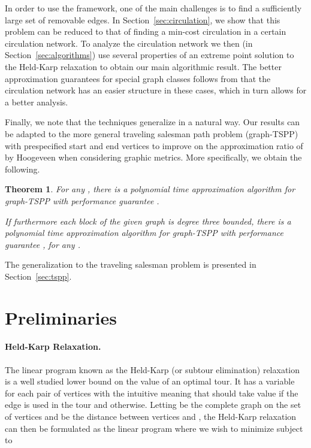 \documentclass[letterpaper,11pt]{article}
\newtheorem{theorem}{Theorem}[section]
\newcommand{\HPP}{graph-TSPP\xspace}
\begin{document}
    In order to use the framework, one of the main challenges is to find a
    sufficiently large set of removable edges. In
    Section~\ref{sec:circulation}, we show that this problem can be
    reduced to that of finding a min-cost circulation in a certain
    circulation network.  To analyze the circulation network we then (in
    Section~\ref{sec:algorithms}) use several properties of an extreme point solution to
    the Held-Karp relaxation to obtain our main algorithmic result. The
    better approximation guarantees for special graph classes follows from
    that the circulation network has an easier structure in these cases,
    which in turn allows for a better analysis.

    Finally, we note that the techniques generalize in a natural way. Our
    results can be adapted to the more general traveling salesman path
    problem (\HPP) with prespecified start and end vertices to improve on the
    approximation ratio of  by Hoogeveen \cite{Hoo91} when
    considering graphic metrics. More specifically, we obtain the
    following.
    \begin{theorem}\label{thm:approximationratiohpp}
        For any , there is a polynomial time approximation algorithm for
        \HPP with performance guarantee 
        .

        If furthermore each block of the given graph is degree three bounded, there is a
        polynomial time approximation algorithm for \HPP with performance
        guarantee , for any .
    \end{theorem}
    The generalization to the traveling salesman problem is presented in
    Section~\ref{sec:tspp}.

\section{Preliminaries}\label{sec:prelim}
    \vspace{-0.1cm}
    \paragraph{Held-Karp Relaxation.} The linear program known as the
    Held-Karp (or subtour elimination) relaxation is a well studied lower
    bound on the value of an optimal tour. It has a variable 
    for each pair of vertices with the intuitive meaning that
     should take value  if the edge  is used in
    the tour and  otherwise. Letting  be the complete graph on
    the set of vertices and  be the distance between vertices
     and , the Held-Karp relaxation can then be formulated as the
    linear program where we wish to  minimize  subject to
\end{document}
